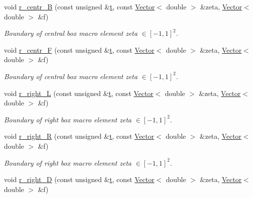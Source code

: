\begin{DoxyCompactItemize}
void \hyperlink{classoomph_1_1EighthSphereDomain_a3ba94d9786fc6c544d82a392f8bf3dd6}{r\+\_\+centr\+\_\+B} (const unsigned \&\hyperlink{cfortran_8h_af6f0bd3dc13317f895c91323c25c2b8f}{t}, const \hyperlink{classoomph_1_1Vector}{Vector}$<$ double $>$ \&zeta, \hyperlink{classoomph_1_1Vector}{Vector}$<$ double $>$ \&f)
\begin{DoxyCompactList}\small\item\em Boundary of central box macro element zeta $ \in [-1,1]^2 $. \end{DoxyCompactList}\item 
void \hyperlink{classoomph_1_1EighthSphereDomain_a080334e0a4e7cd61c97f0b2bf1174f00}{r\+\_\+centr\+\_\+F} (const unsigned \&\hyperlink{cfortran_8h_af6f0bd3dc13317f895c91323c25c2b8f}{t}, const \hyperlink{classoomph_1_1Vector}{Vector}$<$ double $>$ \&zeta, \hyperlink{classoomph_1_1Vector}{Vector}$<$ double $>$ \&f)
\begin{DoxyCompactList}\small\item\em Boundary of central box macro element zeta $ \in [-1,1]^2 $. \end{DoxyCompactList}\item 
void \hyperlink{classoomph_1_1EighthSphereDomain_ad029a857dd1b83ed10281613e0c56800}{r\+\_\+right\+\_\+L} (const unsigned \&\hyperlink{cfortran_8h_af6f0bd3dc13317f895c91323c25c2b8f}{t}, const \hyperlink{classoomph_1_1Vector}{Vector}$<$ double $>$ \&zeta, \hyperlink{classoomph_1_1Vector}{Vector}$<$ double $>$ \&f)
\begin{DoxyCompactList}\small\item\em Boundary of right box macro element zeta $ \in [-1,1]^2 $. \end{DoxyCompactList}\item 
void \hyperlink{classoomph_1_1EighthSphereDomain_a58ec95dc35f526fe5c6baa2578a2f786}{r\+\_\+right\+\_\+R} (const unsigned \&\hyperlink{cfortran_8h_af6f0bd3dc13317f895c91323c25c2b8f}{t}, const \hyperlink{classoomph_1_1Vector}{Vector}$<$ double $>$ \&zeta, \hyperlink{classoomph_1_1Vector}{Vector}$<$ double $>$ \&f)
\begin{DoxyCompactList}\small\item\em Boundary of right box macro element zeta $ \in [-1,1]^2 $. \end{DoxyCompactList}\item 
void \hyperlink{classoomph_1_1EighthSphereDomain_a7a4a1a98b542afd49a5ec8abfda287fc}{r\+\_\+right\+\_\+D} (const unsigned \&\hyperlink{cfortran_8h_af6f0bd3dc13317f895c91323c25c2b8f}{t}, const \hyperlink{classoomph_1_1Vector}{Vector}$<$ double $>$ \&zeta, \hyperlink{classoomph_1_1Vector}{Vector}$<$ double $>$ \&f)

\end{DoxyCompactItemize}
